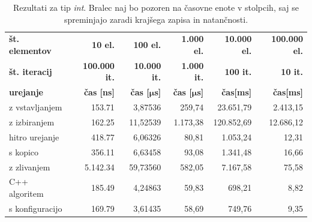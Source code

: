 \documentclass[a4paper,oneside,12pt]{article}
\newcommand{\bmu}{\ensuremath{\boldsymbol{\mu}}}
\newcommand{\usec}{\ensuremath{\bmu}s}
\begin{document}
\begin{table}[h!]
  \caption[Rezultati za tip \emph{int}]{Rezultati za tip \emph{int}. Bralec naj bo pozoren na časovne enote
  v stolpcih, saj se spreminjajo zaradi krajšega zapisa in natančnosti.}
  \label{tab:rez:int} \vspace{1ex}
  \begin{tabular}{l!{\vrule width 1pt}r|r|r|r|r}
    \bf št. elementov    & \bf 10 el.& \bf 100 el.& \bf 1.000 el. & \bf 10.000 el. & \bf 100.000 el. \\ 
    \bf št. iteracij     & \bf 100.000 it. & \bf 10.000 it. & \bf 1.000 it. & \bf 100 it. &  \bf 10 it.\\ \hline
    \bf urejanje         & \bf čas [ns] & \bf čas [\usec] & \bf čas [\usec] & \bf čas[ms] & \bf čas[ms] \\  
    z vstavljanjem       &   153.71 &  3,87536 &  259,74  &  23.651,79  &  2.413,15 \\ \hline
    z izbiranjem         &   162.25 & 11,52539 & 1.173,38 & 120.852,69  & 12.686,12 \\ \hline
    hitro urejanje       &   418.77 &  6,06326 &   80,81  &   1.053,24  &     12,31 \\ \hline
    s kopico             &   356.11 &  6,63458 &   93,08  &   1.341,48  &     16,66 \\ \hline
    z zlivanjem          & 5.142.34 & 59,73560 &  582,05  &   7.167,58  &     75,58 \\ \hline
    C++ algoritem        &   185.49 &  4,24863 &   59,83  &     698,21  &      8,82 \\ \hline
    s konfiguracijo      &   169.79 &  3,61435 &   58,69  &     749,76  &      9,35 \\ 
  \end{tabular}
\end{table}
\end{document}

